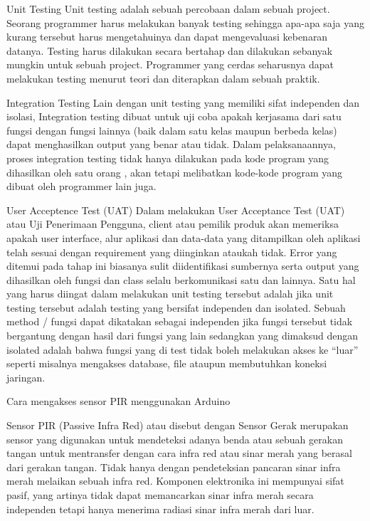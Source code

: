 Unit Testing
Unit testing adalah sebuah percobaan dalam sebuah project. Seorang programmer harus melakukan banyak testing sehingga apa-apa saja yang kurang tersebut harus mengetahuinya dan dapat mengevaluasi kebenaran datanya. Testing harus dilakukan secara bertahap dan dilakukan sebanyak mungkin untuk sebuah project. Programmer yang cerdas seharusnya dapat melakukan testing menurut teori dan diterapkan dalam sebuah praktik.
 
Integration Testing
Lain dengan unit testing yang memiliki sifat independen dan isolasi, Integration testing dibuat untuk uji coba apakah kerjasama dari satu fungsi dengan fungsi lainnya (baik dalam satu kelas maupun berbeda kelas) dapat menghasilkan output yang benar atau tidak. Dalam pelaksanaannya, proses integration testing tidak hanya dilakukan pada kode program yang dihasilkan oleh satu orang , akan tetapi melibatkan  kode-kode program yang dibuat oleh programmer lain juga.

User Acceptence Test (UAT)
Dalam melakukan User Acceptance Test (UAT) atau Uji Penerimaan Pengguna, client atau pemilik produk akan memeriksa apakah user interface, alur aplikasi dan data-data yang ditampilkan oleh aplikasi telah sesuai dengan requirement yang diinginkan ataukah tidak. Error yang ditemui pada tahap ini biasanya sulit diidentifikasi sumbernya serta output yang dihasilkan oleh fungsi dan class selalu berkomunikasi satu dan lainnya.
Satu hal yang harus diingat dalam melakukan unit testing tersebut adalah jika unit testing tersebut adalah testing yang bersifat independen dan isolated. Sebuah method / fungsi dapat dikatakan sebagai independen jika fungsi tersebut tidak bergantung dengan hasil dari fungsi yang lain sedangkan yang dimaksud dengan isolated adalah bahwa fungsi yang di test tidak boleh melakukan akses ke “luar” seperti misalnya mengakses database, file ataupun membutuhkan koneksi jaringan.


Cara mengakses sensor PIR menggunakan Arduino

Sensor PIR (Passive Infra Red) atau disebut dengan Sensor Gerak merupakan sensor yang digunakan untuk mendeteksi adanya benda atau sebuah gerakan tangan untuk mentransfer dengan cara infra red atau sinar merah yang berasal dari gerakan tangan. Tidak hanya dengan pendeteksian pancaran sinar infra merah melaikan sebuah infra red.
Komponen elektronika ini mempunyai sifat pasif, yang artinya tidak dapat memancarkan sinar infra merah secara independen tetapi hanya menerima radiasi sinar infra merah dari luar.

